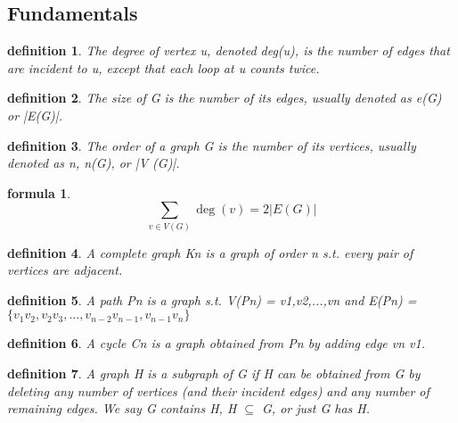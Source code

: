 \documentclass[2pt]{article}
\title{}
\newtheorem{definition}{definition}
\newtheorem{formula}{formula}
\begin{document}
\begin{CJK*}{UTF8}{bkai}


\section*{Fundamentals}
\begin{paracol}{2} %
    \switchcolumn[0]
    \begin{definition}
        The degree of vertex u, denoted deg(u), is the number of edges that are
 incident to u, except that each loop at u counts twice.
    \end{definition}

    \begin{definition}
    The size of G is the number of its edges, usually denoted as e(G) or |E(G)|.
    \end{definition}
    
    \begin{definition}
        The order of a graph G is the number of its vertices, usually denoted as n,
 n(G), or |V (G)|.
    \end{definition}
    
    \begin{formula}
    \[
    \sum_{v \in V(G)} \deg(v) = 2 |E(G)|
    \]
    \end{formula}

    \begin{definition}
        A complete graph Kn is a graph of order n s.t. every pair of vertices are
 adjacent.
    \end{definition}

    \begin{definition}
        A path Pn is a graph s.t. V(Pn) = {v1,v2,...,vn} and
 E(Pn) = $\{v_{1}v_{2},v_{2}v_{3},...,v_{n−2}v_{n−1},v_{n−1}v_{n}\}$
    \end{definition}

    \begin{definition}
        A cycle Cn is a graph obtained from Pn by adding edge vn v1.
    \end{definition}

    \begin{definition}
     A graph H is a subgraph of G if H can be obtained from G by deleting any
 number of vertices (and their incident edges) and any number of remaining
 edges. We say G contains H, H $\subseteq$ G, or just G has H.        
    \end{definition}
    

\end{paracol}
\end{CJK*}
\end{document}
